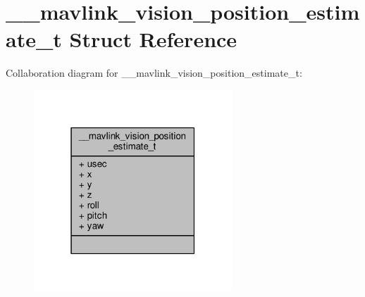 \hypertarget{struct____mavlink__vision__position__estimate__t}{\section{\+\_\+\+\_\+mavlink\+\_\+vision\+\_\+position\+\_\+estimate\+\_\+t Struct Reference}
\label{struct____mavlink__vision__position__estimate__t}
}


Collaboration diagram for \+\_\+\+\_\+mavlink\+\_\+vision\+\_\+position\+\_\+estimate\+\_\+t\+:
\nopagebreak
\begin{figure}[H]
\begin{center}
\leavevmode
\includegraphics[width=211pt]{struct____mavlink__vision__position__estimate__t__coll__graph}
\end{center}
\end{figure}
